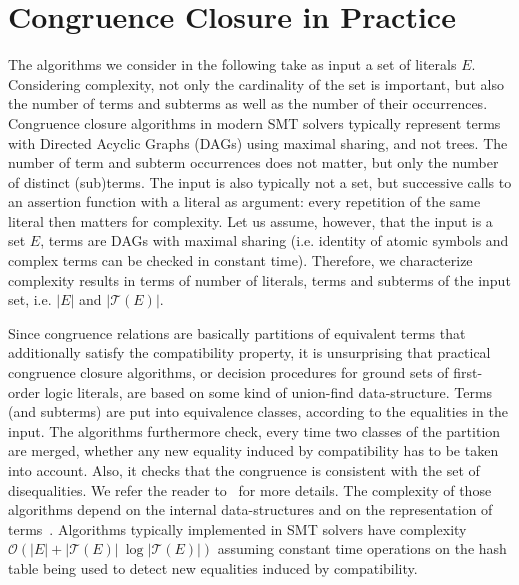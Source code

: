 \documentclass[smallextended]{svjour3}
\begin{document}
\section{Congruence Closure in Practice}

The algorithms we consider in the following take as input a set of literals $E$.
Considering complexity, not only the cardinality of the set is important, but
also the number of terms and subterms as well as the number of their
occurrences.  Congruence closure algorithms in modern SMT solvers typically
represent terms with Directed Acyclic Graphs (DAGs) using maximal sharing, and
not trees.  The number of term and subterm occurrences does not matter, but only
the number of distinct (sub)terms.  The input is also typically not a set, but
successive calls to an assertion function with a literal as argument: every
repetition of the same literal then matters for complexity.  Let us assume,
however, that the input is a set $E$, terms are DAGs with maximal
sharing (i.e. identity of atomic symbols and complex terms can be checked in constant time). Therefore, we
characterize complexity results in terms of number of literals, terms and
subterms of the input set, i.e. $|E|$ and $|\mathcal{T}(E)|$.

Since congruence relations are basically partitions of equivalent terms that
additionally satisfy the compatibility property, it is unsurprising that
practical congruence closure algorithms, or decision procedures for ground sets
of first-order logic literals, are based on some kind of union-find
data-structure.  Terms (and subterms) are put into equivalence classes,
according to the equalities in the input.  The algorithms furthermore check,
every time two classes of the partition are merged, whether any new equality induced
by compatibility has to be taken into account.  Also, it checks that the
congruence is consistent with the set of disequalities.  We refer the reader
to~\cite{Nelson2,Downey1,Nieuwenhuis6} for more details.  The complexity of
those algorithms depend on the internal data-structures and on the
representation of terms~\cite{Downey1}.  Algorithms typically implemented in SMT
solvers have complexity $\mathcal{O}(|E| + |\mathcal{T}(E)|\ \log
|\mathcal{T}(E)|)$ assuming constant time operations on the hash table being used to detect new equalities induced by compatibility.
\end{document}
